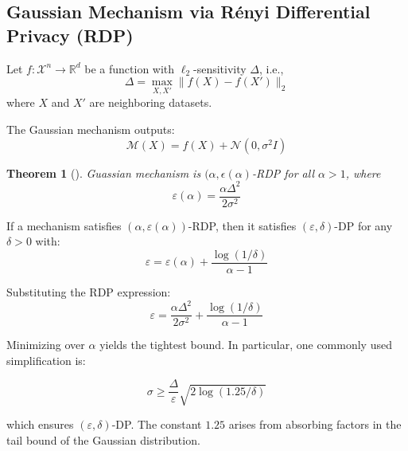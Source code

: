 \documentclass[11pt, a4paper]{article}
\newtheorem{theorem}{Theorem}
\begin{document}
\subsection{Gaussian Mechanism via Rényi Differential Privacy (RDP)}
Let $f : \mathcal{X}^n \to \mathbb{R}^d$ be a function with $\ell_2$-sensitivity $\Delta$, i.e.,
\[
\Delta = \max_{X, X'} \|f(X) - f(X')\|_2
\]
where $X$ and $X'$ are neighboring datasets.

The Gaussian mechanism outputs:
\[
\mathcal{M}(X) = f(X) + \mathcal{N}(0, \sigma^2 I)
\]

\begin{theorem}[\cite{Mironov2017}]
    Guassian mechanism is $(\alpha, \epsilon(\alpha)$-RDP for all $\alpha>1$, where
\[
\varepsilon(\alpha) = \frac{\alpha \Delta^2}{2 \sigma^2}
\]
\end{theorem}
If a mechanism satisfies $(\alpha, \varepsilon(\alpha))$-RDP, then it satisfies $(\varepsilon, \delta)$-DP for any $\delta > 0$ with:
\[
\varepsilon = \varepsilon(\alpha) + \frac{\log(1/\delta)}{\alpha - 1}
\]

Substituting the RDP expression:
\[
\varepsilon = \frac{\alpha \Delta^2}{2 \sigma^2} + \frac{\log(1/\delta)}{\alpha - 1}
\]

Minimizing over $\alpha$ yields the tightest bound. In particular, one commonly used simplification is:

\[
\sigma \geq \frac{\Delta}{\varepsilon} \sqrt{2 \log(1.25/\delta)}
\]

which ensures $(\varepsilon, \delta)$-DP. The constant $1.25$ arises from absorbing factors in the tail bound of the Gaussian distribution.
\end{document}
